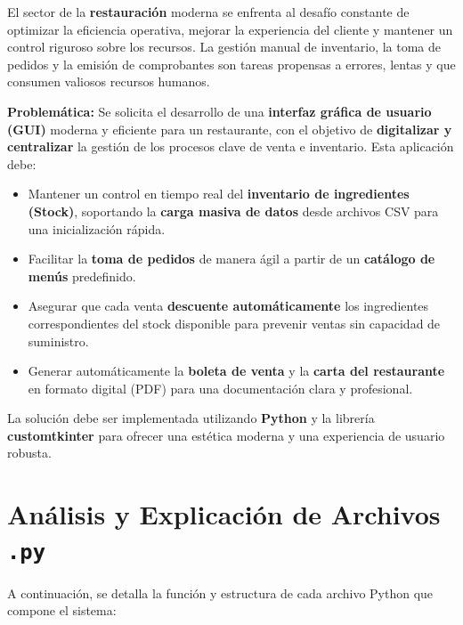 \documentclass[a4paper, 12pt]{article}
\begin{document}
El sector de la \textbf{restauración} moderna se enfrenta al desafío constante de optimizar la eficiencia operativa, mejorar la experiencia del cliente y mantener un control riguroso sobre los recursos. La gestión manual de inventario, la toma de pedidos y la emisión de comprobantes son tareas propensas a errores, lentas y que consumen valiosos recursos humanos.

\textbf{Problemática:} Se solicita el desarrollo de una \textbf{interfaz gráfica de usuario (GUI)} moderna y eficiente para un restaurante, con el objetivo de \textbf{digitalizar y centralizar} la gestión de los procesos clave de venta e inventario. Esta aplicación debe:
\begin{itemize}
    \item Mantener un control en tiempo real del \textbf{inventario de ingredientes (Stock)}, soportando la \textbf{carga masiva de datos} desde archivos CSV para una inicialización rápida.
    \item Facilitar la \textbf{toma de pedidos} de manera ágil a partir de un \textbf{catálogo de menús} predefinido.
    \item Asegurar que cada venta \textbf{descuente automáticamente} los ingredientes correspondientes del stock disponible para prevenir ventas sin capacidad de suministro.
    \item Generar automáticamente la \textbf{boleta de venta} y la \textbf{carta del restaurante} en formato digital (PDF) para una documentación clara y profesional.
\end{itemize}
La solución debe ser implementada utilizando \textbf{Python} y la librería \textbf{customtkinter} para ofrecer una estética moderna y una experiencia de usuario robusta.

\newpage

\section{Análisis y Explicación de Archivos \texttt{.py}}

A continuación, se detalla la función y estructura de cada archivo Python que compone el sistema:
\end{document}
